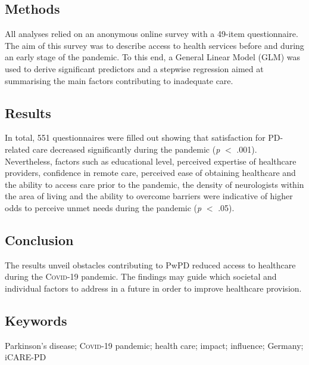 \documentclass[a4paper,oneside,11pt,english]{scrartcl}
\begin{document}
\subsection*{Methods} 
All analyses relied on an anonymous online survey with a 49-item questionnaire. The aim of this survey was to describe access to health services before and during an early stage of the pandemic. To this end, a General Linear Model (GLM) was used to derive significant predictors and a stepwise regression aimed at summarising the main factors contributing to inadequate care.  
\subsection*{Results}
In total, 551 questionnaires were filled out showing that satisfaction for \textsc{PD}-related care decreased significantly during the pandemic (\textit{p} $<$ .001). Nevertheless, factors such as educational level, perceived expertise of healthcare providers, confidence in remote care, perceived ease of obtaining healthcare and the ability to access care prior to the pandemic, the density of neurologists within the area of living and the ability to overcome barriers were indicative of higher odds to perceive unmet needs during the pandemic (\textit{p} $<$ .05).
\subsection*{Conclusion}
The results unveil obstacles contributing to PwPD reduced access to healthcare during the \textsc{Covid}-19 pandemic. The findings may guide which societal and individual factors to address in a future in order to improve healthcare provision.
\subsection*{Keywords}
Parkinson's disease; \textsc{Covid}-19 pandemic; health care; impact; influence; Germany; iCARE-\textsc{PD}

\newpage
\end{document}
